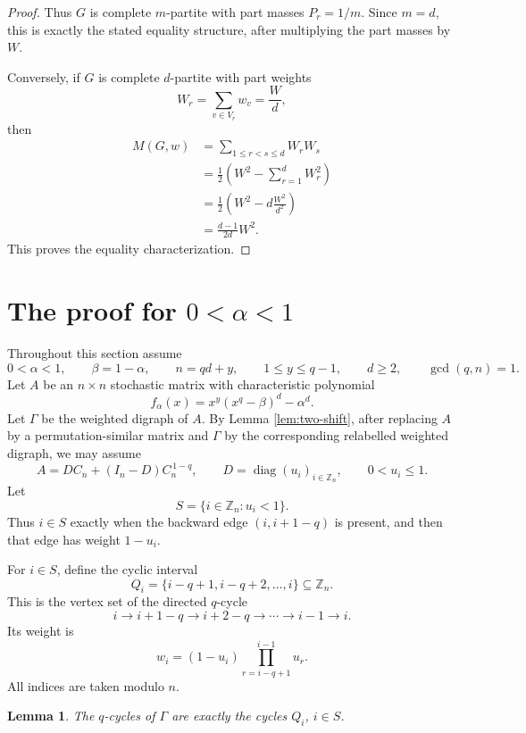\documentclass[11pt]{article}
\numberwithin{equation}{section}
\newtheorem{lemma}[theorem]{Lemma}
\newcommand{\Zn}{\mathbb Z_n}
\begin{document}
\begin{proof}
Thus $G$ is complete $m$-partite with part masses $P_r=1/m$. Since $m=d$,
this is exactly the stated equality structure, after multiplying the part
masses by $W$.

Conversely, if $G$ is complete $d$-partite with part weights
\[
        W_r=\sum_{v\in V_r}w_v=\frac Wd,
\]
then
\[
        \begin{aligned}
        M(G,w)
        &=\sum_{1\le r<s\le d}W_rW_s\\
        &=\frac12\left(W^2-\sum_{r=1}^d W_r^2\right)\\
        &=\frac12\left(W^2-d\frac{W^2}{d^2}\right)\\
        &=\frac{d-1}{2d}W^2.
        \end{aligned}
\]
This proves the equality characterization.
\end{proof}

\section{The proof for $0<\alpha<1$}

Throughout this section assume
\[
        0<\alpha<1,\qquad \beta=1-\alpha,\qquad n=qd+y,
        \qquad 1\le y\le q-1,\qquad d\ge2,\qquad \gcd(q,n)=1.
\]
Let $A$ be an $n\times n$ stochastic matrix with characteristic polynomial
\[
        f_\alpha(x)=x^y(x^q-\beta)^d-\alpha^d.
\]
Let $\Gamma$ be the weighted digraph of $A$. By Lemma \ref{lem:two-shift},
after replacing $A$ by a permutation-similar matrix and $\Gamma$ by the
corresponding relabelled weighted digraph, we may assume
\[
        A=DC_n+(I_n-D)C_n^{\,1-q},
        \qquad D=\operatorname{diag}(u_i)_{i\in\Zn},
        \qquad 0<u_i\le1.
\]
Let
\[
        S=\{i\in\Zn:u_i<1\}.
\]
Thus $i\in S$ exactly when the backward edge $(i,i+1-q)$ is present, and then
that edge has weight $1-u_i$.

For $i\in S$, define the cyclic interval
\[
        Q_i=\{i-q+1,i-q+2,\ldots,i\}\subseteq\Zn.
\]
This is the vertex set of the directed $q$-cycle
\[
        i\to i+1-q\to i+2-q\to\cdots\to i-1\to i.
\]
Its weight is
\[
        w_i=(1-u_i)\prod_{r=i-q+1}^{i-1}u_r.
\]
All indices are taken modulo $n$.

\begin{lemma}\label{lem:qcycles}
The $q$-cycles of $\Gamma$ are exactly the cycles $Q_i$, $i\in S$.
\end{lemma}
\end{document}
